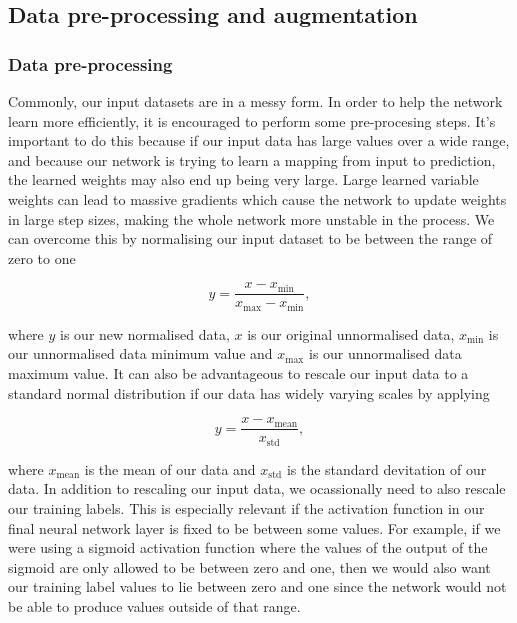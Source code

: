 \subsection{Data pre-processing and augmentation}

\subsubsection{Data pre-processing}
Commonly, our input datasets are in a messy form. In order to help the network learn more efficiently, it is encouraged to perform some pre-procesing steps. It's important to do this because if our input data has large values over a wide range, and because our network is trying to learn a mapping from input to prediction, the learned weights may also end up being very large. Large learned variable weights can lead to massive gradients which cause the network to update weights in large step sizes, making the whole network more unstable in the process. We can overcome this by normalising our input dataset to be between the range of zero to one 

\begin{equation}
    y = \frac{x - x_{\textrm{min}}}{x_{\textrm{max}}-x_{\textrm{min}}},
\end{equation}

where $y$ is our new normalised data, $x$ is our original unnormalised data, $x_{\textrm{min}}$ is our unnormalised data minimum value and $x_{\textrm{max}}$ is our unnormalised data maximum value. It can also be advantageous to rescale our input data to a standard normal distribution if our data has widely varying scales by applying 

\begin{equation}
    y = \frac{x - x_{\textrm{mean}}}{x_{\textrm{std}}},
\end{equation}

where $x_{\textrm{mean}}$ is the mean of our data and $x_{\textrm{std}}$ is the standard devitation of our data. In addition to rescaling our input data, we ocassionally need to also rescale our training labels. This is especially relevant if the activation function in our final neural network layer is fixed to be between some values. For example, if we were using a sigmoid activation function where the values of the output of the sigmoid are only allowed to be between zero and one, then we would also want our training label values to lie between zero and one since the network would not be able to produce values outside of that range.

